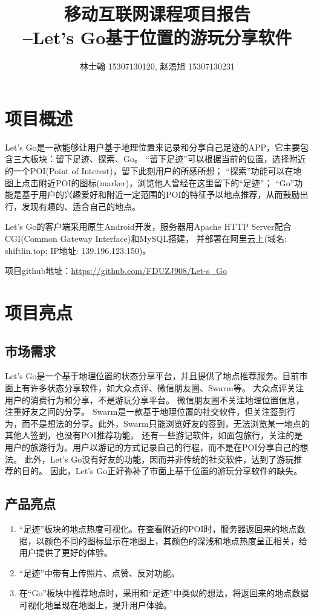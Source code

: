 \documentclass[UTF8]{article}
\begin{document}
\begin{titlepage}
\title{\bfseries 移动互联网课程项目报告\\--Let's Go基于位置的游玩分享软件}
\author{林士翰 15307130120, 赵浯旭 15307130231}
\date{}
\maketitle
\tableofcontents
\thispagestyle{empty}
\end{titlepage}

\section{项目概述}
Let's Go是一款能够让用户基于地理位置来记录和分享自己足迹的APP，它主要包含三大板块：留下足迹、探索、Go。
“留下足迹”可以根据当前的位置，选择附近的一个POI(Point of Interest)，留下此刻用户的所感所想；
“探索”功能可以在地图上点击附近POI的图标(marker)，浏览他人曾经在这里留下的“足迹”；
“Go”功能是基于用户的兴趣爱好和附近一定范围的POI的特征予以地点推荐，从而鼓励出行，发现有趣的、适合自己的地点。

Let's Go的客户端采用原生Android开发，服务器用Apache HTTP Server配合CGI(Common Gateway Interface)和MySQL搭建，
并部署在阿里云上(域名: shiftlin.top; IP地址: 139.196.123.150)。

项目github地址：\url{https://github.com/FDUZJ908/Let-s_Go}


\section{项目亮点}
\subsection{市场需求}
Let's Go是一个基于地理位置的状态分享平台，并且提供了地点推荐服务。目前市面上有许多状态分享软件，如大众点评、微信朋友圈、Swarm等。
大众点评关注用户的消费行为和分享，不是游玩分享平台。
微信朋友圈不关注地理位置信息，注重好友之间的分享。
Swarm是一款基于地理位置的社交软件，但关注签到行为，而不是想法的分享。此外，Swarm只能浏览好友的签到，无法浏览某一地点的其他人签到，也没有POI推荐功能。
还有一些游记软件，如面包旅行，关注的是用户的旅游行为。用户以游记的方式记录自己的行程，而不是在POI分享自己的想法。
此外，Let's Go没有好友的功能，因而并非传统的社交软件，达到了游玩推荐的目的。
因此，Let's Go正好弥补了市面上基于位置的游玩分享软件的缺失。

\subsection{产品亮点}
\begin{enumerate}
    \item “足迹”板块的地点热度可视化。在查看附近的POI时，服务器返回来的地点数据，以颜色不同的图标显示在地图上，其颜色的深浅和地点热度呈正相关，给用户提供了更好的体验。
    \item “足迹”中带有上传照片、点赞、反对功能。
    \item 在“Go”板块中推荐地点时，采用和“足迹”中类似的想法，将返回来的地点数据可视化地呈现在地图上，提升用户体验。
\end{enumerate}
\end{document}
